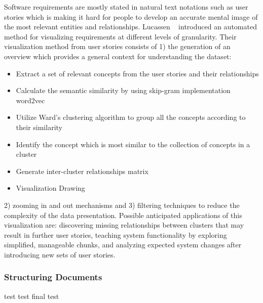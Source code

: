 Software requirements are mostly stated in natural text notations such as user stories which is making it hard for people to develop an accurate mental image of the most relevant entities and relationships. Lucassen \etal~\cite{Lucassen:2016} introduced an automated method for visualizing requirements at different levels of granularity. Their visualization method from user stories consists of 1) the generation of an overview which provides a general context for understanding the dataset: 
\begin{itemize}
\item Extract a set of relevant concepts from the user stories and their relationships 
\item Calculate the semantic similarity by using skip-gram implementation word2vec
\item Utilize Ward’s clustering algorithm to group all the concepts according to their similarity 
\item Identify the concept which is most similar to the collection of concepts in a cluster
\item Generate inter-cluster relationships matrix
\item Visualization Drawing
\end{itemize}
2) zooming in and out mechanisms and 3) filtering techniques to reduce the complexity of the data presentation. Possible anticipated applications of this visualization are: discovering missing relationships between clusters that may result in further user stories, teaching system functionality by exploring simplified, manageable chunks, and analyzing expected system changes after introducing new sets of user stories. 

\subsubsection{Structuring Documents}

test
test
final test